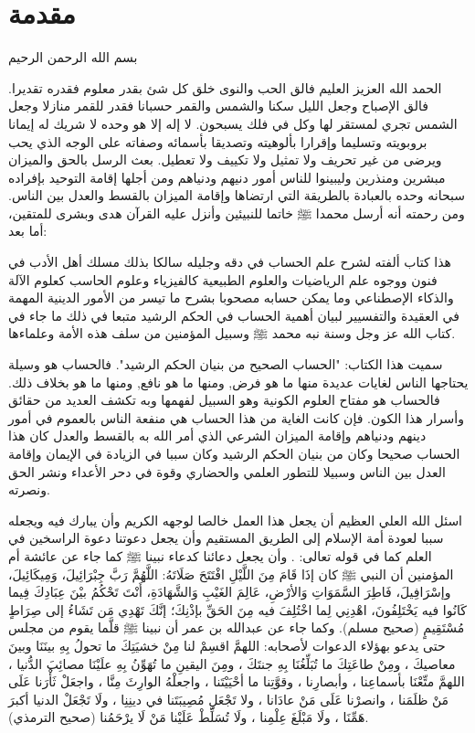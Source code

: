 \chapter{مقدمة}

\begin{center}
    بسم الله الرحمن الرحيم
\end{center}

الحمد الله العزيز العليم فالق الحب والنوى خلق كل شئ بقدر معلوم فقدره تقديرا. فالق الإصباح وجعل الليل سكنا والشمس والقمر حسبانا فقدر للقمر منازلا وجعل الشمس تجري لمستقر لها وكل في فلك يسبحون. لا إله إلا هو وحده لا شريك له  إيمانا بروبويته وتسليما وإقرارا بألوهيته وتصديقا بأسمائه وصفاته على الوجه الذي يحب ويرضى من غير تحريف ولا تمثيل ولا تكييف ولا تعطيل. بعث الرسل بالحق والميزان مبشرين ومنذرين وليبينوا للناس أمور دنيهم ودنياهم ومن أجلها إقامة التوحيد بإفراده سبحانه وحده بالعبادة بالطريقة التي ارتضاها وإقامة الميزان بالقسط والعدل بين الناس. ومن رحمته أنه أرسل محمدا ﷺ خاتما للنبيئين وأنزل عليه القرآن هدى وبشرى للمتقين، أما بعد:

هذا كتاب ألفته لشرح علم الحساب في دقه وجليله سالكا بذلك مسلك أهل الأدب في فنون ووجوه علم الرياضيات والعلوم الطبيعية كالفيزياء وعلوم الحاسب كعلوم الآلة والذكاء الإصطناعي وما يمكن حسابه مصحوبا بشرح ما تيسر من الأمور الدينية المهمة في العقيدة والتفسيير لبيان أهمية الحساب في الحكم الرشيد متبعا في ذلك ما جاء في كتاب الله عز وجل وسنة نبه محمد ﷺ وسبيل المؤمنين من سلف هذه الأمة وعلماءها.

سميت هذا الكتاب: "الحساب الصحيح من بنيان الحكم الرشيد". فالحساب هو وسيلة يحتاجها الناس لغايات عديدة منها ما هو فرض, ومنها ما هو نافع, ومنها ما هو بخلاف ذلك. فالحساب هو مفتاح العلوم الكونية وهو السبيل لفهمها وبه تكشف العديد من حقائق وأسرار هذا الكون. فإن كانت الغاية من هذا الحساب هي منفعة الناس بالعموم في أمور دينهم ودنياهم وإقامة الميزان الشرعي الذي أمر الله به بالقسط والعدل كان هذا الحساب صحيحا وكان من بنيان الحكم الرشيد وكان سببا في الزيادة في الإيمان وإقامة العدل بين الناس وسبيلا للتطور العلمي والحضاري وقوة في دحر الأعداء ونشر الحق ونصرته.

اسئل الله العلي العظيم أن يجعل هذا العمل خالصا لوجهه الكريم وأن يبارك فيه ويجعله سببا لعودة أمة الإسلام إلى الطريق المستقيم وأن يجعل دعوتنا دعوة الراسخين في العلم كما في قوله تعالى:
\quranayah*[3][7][32]\quranayah*[3][8]{\footnotesize \surahname*[3]}. وأن يجعل دعائنا كدعاء نبينا ﷺ كما جاء عن عائشة أم المؤمنين أن النبي ﷺ كان إذَا قَامَ مِنَ اللَّيْلِ افْتَتَحَ صَلَاتَهُ: اللَّهُمَّ رَبَّ جِبْرَائِيلَ، وَمِيكَائِيلَ، وإسْرَافِيلَ، فَاطِرَ السَّمَوَاتِ وَالأرْضِ، عَالِمَ الغَيْبِ وَالشَّهَادَةِ، أَنْتَ تَحْكُمُ بيْنَ عِبَادِكَ فِيما كَانُوا فيه يَخْتَلِفُونَ، اهْدِنِي لِما اخْتُلِفَ فيه مِنَ الحَقِّ بإذْنِكَ؛ إنَّكَ تَهْدِي مَن تَشَاءُ إلى صِرَاطٍ مُسْتَقِيمٍ {\footnotesize (صحيح مسلم)}.  وكما جاء عن عبدالله بن عمر أن نبينا ﷺ قلَّما يقوم من مجلس حتى يدعو بهؤلاء الدعوات لأصحابه: اللهمَّ اقسِمْ لنا مِنْ خشيَتِكَ ما تحولُ بِهِ بينَنَا وبينَ معاصيكَ ، ومِنْ طاعَتِكَ ما تُبَلِّغُنَا بِهِ جنتَكَ ، ومِنَ اليقينِ ما تُهَوِّنُ بِهِ علَيْنَا مصائِبَ الدُّنيا ، اللهمَّ متِّعْنَا بأسماعِنا ، وأبصارِنا ، وقوَّتِنا ما أحْيَيْتَنا ، واجعلْهُ الوارِثَ مِنَّا ، واجعَلْ ثَأْرَنا عَلَى مَنْ ظلَمَنا ، وانصرْنا عَلَى مَنْ عادَانا ، ولا تَجْعَلِ مُصِيبَتَنا في دينِنِا ، ولَا تَجْعَلْ الدنيا أكبرَ هَمِّنَا ، ولَا مَبْلَغَ عِلْمِنا ، ولَا تُسَلِّطْ عَلَيْنا مَنْ لَا يرْحَمُنا (صحيح الترمذي).